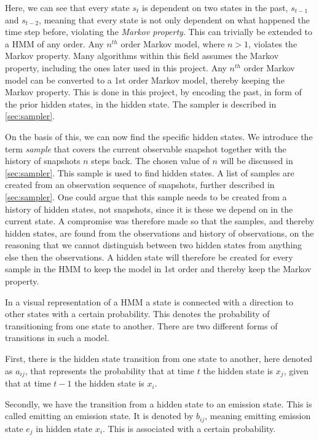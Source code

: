 Here, we can see that every state $s_t$ is dependent on two states in the past, $s_{t-1}$ and $s_{t-2}$, meaning that every state is not only dependent on what happened the time step before, violating the \emph{Markov property}. This can trivially be extended to a HMM of any order. Any $n^{th}$ order Markov model, where $n>1$, violates the Markov property. Many algorithms within this field assumes the Markov property, including the ones later used in this project. Any $n^{th}$ order Markov model can be converted to a 1st order Markov model, thereby keeping the Markov property. This is done in this project, by encoding the past, in form of the prior hidden states, in the hidden state. The sampler is described in \cref{sec:sampler}.

On the basis of this, we can now find the specific hidden states. We introduce the term \emph{sample} that covers the current observable snapshot together with the history of snapshots $n$ steps back. The chosen value of $n$ will be discussed in \cref{sec:sampler}. This sample is used to find hidden states. A list of samples are created from an observation sequence of snapshots, further described in \cref{sec:sampler}. One could argue that this sample needs to be created from a history of hidden states, not snapshots, since it is these we depend on in the current state. A compromise was therefore made so that the samples, and thereby hidden states, are found from the observations and history of observations, on the reasoning that we cannot distinguish between two hidden states from anything else then the observations. A hidden state will therefore be created for every sample in the HMM to keep the model in 1st order and thereby keep the Markov property.

In a visual representation of a HMM a state is connected with a direction to other states with a certain probability. This denotes the probability of transitioning from one state to another. There are two different forms of transitions in such a model.

First, there is the hidden state transition from one state to another, here denoted as $a_{ij}$, that represents the probability that at time $t$ the hidden state is $x_j$, given that at time $t-1$ the hidden state is $x_i$.

Secondly, we have the transition from a hidden state to an emission state. This is called emitting an emission state. It is denoted by $b_{ij}$, meaning emitting emission state $e_j$ in hidden state $x_i$. This is associated with a certain probability.

